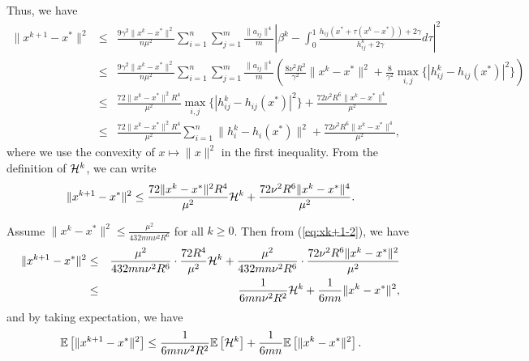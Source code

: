 \documentclass[12pt]{article}
\newcommand{\ExpBr}[1]{\mathbb{E}\left[#1\right]}
\newcommand{\newalpha}{h}
\begin{document}
Thus, we have 
\begin{eqnarray}
\|x^{k+1} - x^*\|^2 &\leq& \frac{9\gamma^2\|x^k - x^*\|^2}{n \mu^2} \sum_{i=1}^n \sum_{j=1}^{m} \frac{\|a_{ij}\|^4}{m} \left|   \beta^k - \int_{0}^1 \frac{\newalpha_{ij}(x^* + \tau(x^k - x^*)) + 2\gamma}{ h_{ij}^k + 2\gamma} d\tau   \right|^2 \nonumber \\ 
&\leq& \frac{9\gamma^2\|x^k - x^*\|^2}{n \mu^2} \sum_{i=1}^n \sum_{j=1}^{m} \frac{\|a_{ij}\|^4}{m} \left(  \frac{8\nu^2 R^2}{\gamma^2} \|x^k - x^*\|^2 + \frac{8}{\gamma^2} \max_{i, j} \{|h_{ij}^k - \newalpha_{ij}(x^*)|^2 \}    \right) \nonumber \\ 
&\leq& \frac{72\|x^k - x^*\|^2 R^4}{\mu^2} \max_{i, j} \{|h_{ij}^k - \newalpha_{ij}(x^*)|^2 \}  +   \frac{72\nu^2 R^6\|x^k - x^*\|^4 }{\mu^2} \label{eq:forinitiallm} \\ 
&\leq&  \frac{72\|x^k - x^*\|^2 R^4}{\mu^2} \sum_{i=1}^n \|h_i^k - \newalpha_i(x^*)\|^2 +   \frac{72\nu^2 R^6\|x^k - x^*\|^4 }{\mu^2}, \nonumber 
\end{eqnarray}
where we use the convexity of $x\mapsto \|x\|^2$ in the first inequality. From the definition of ${\cal H}^k$, we can write 
\begin{equation}\label{eq:xk+1-2}
\|x^{k+1} - x^*\|^2 \leq  \frac{72\|x^k - x^*\|^2 R^4}{\mu^2} {\cal H}^k +   \frac{72\nu^2 R^6\|x^k - x^*\|^4 }{\mu^2}. 
\end{equation}


Assume $\|x^k - x^*\|^2 \leq \frac{\mu^2}{432m n \nu^2R^6}$ for all $k\geq 0$. Then from (\ref{eq:xk+1-2}), we have 
\begin{eqnarray*}
	\|x^{k+1} - x^*\|^2 &\leq& \frac{\mu^2}{432 mn\nu^2 R^6} \cdot \frac{72R^4}{\mu^2}{\cal H}^k + \frac{\mu^2}{432mn\nu^2 R^6} \cdot \frac{ 72\nu^2 R^6\|x^k-x^*\|^2}{\mu^2} \\ 
	&\leq& \frac{1}{6mn \nu^2 R^2} {\cal H}^k + \frac{1}{6mn} \|x^k - x^*\|^2, 
\end{eqnarray*}
and by taking expectation, we have 
\begin{equation}\label{eq:expxk+1-2}
\ExpBr{\|x^{k+1} - x^*\|^2} \leq  \frac{1}{6mn \nu^2 R^2} \ExpBr{{\cal H}^k} + \frac{1}{6mn} \ExpBr{ \|x^k - x^*\|^2}. 
\end{equation}
\end{document}
